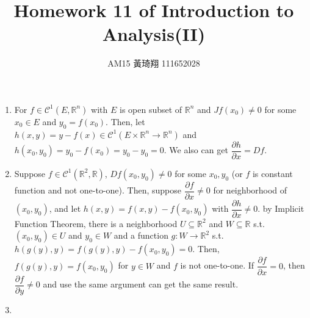 \documentclass[12pt]{article}
\title{Homework 11 of Introduction to Analysis(II)}
\author{AM15 黃琦翔 111652028}
\begin{document}
\maketitle
\begin{enumerate}
    \item For $f \in \mathcal{C}^1(E, \mathbb{R}^n)$ with $E$ is open subset of $\mathbb{R}^n$ and $Jf(x_0) \neq 0$ for some $x_0\in E$ and $y_0 = f(x_0)$.
    Then, let $h(x, y) = y - f(x) \in \mathcal{C}^1(E\times \mathbb{R}^n \to \mathbb{R}^n)$ and $h(x_0, y_0) = y_0 - f(x_0) = y_0 - y_0 = 0$.
    We also can get $\dfrac{\partial h}{\partial x} = Df$.


    \item Suppose $f \in \mathcal{C}^1(\mathbb{R}^2, \mathbb{R})$, $Df(x_0, y_0) \neq 0$ for some $x_0, y_0$
    (or $f$ is constant function and not one-to-one).
    Then, suppose $\dfrac{\partial f}{\partial x} \neq 0$ for neighborhood of $(x_0, y_0)$,
    and let $h(x, y) = f(x, y) - f(x_0, y_0)$ with $\dfrac{\partial h}{\partial x} \neq 0$.
    by Implicit Function Theorem, there is a neighborhood $U \subseteq \mathbb{R}^2$ and $W \subseteq \mathbb{R}$ s.t. $(x_0, y_0) \in U$ and $y_0 \in W$ 
    and a function $g: W \to \mathbb{R}^2$ s.t. $h(g(y), y) = f(g(y), y) - f(x_0, y_0) = 0$.
    Then, $f(g(y), y) = f(x_0, y_0)$ for $y \in W$ and $f$ is not one-to-one.
    If $\dfrac{\partial f}{\partial x} = 0$, then $\dfrac{\partial f}{\partial y} \neq 0$ and use the same argument can get the same result.

    \item 
    
\end{enumerate}
\end{document}
